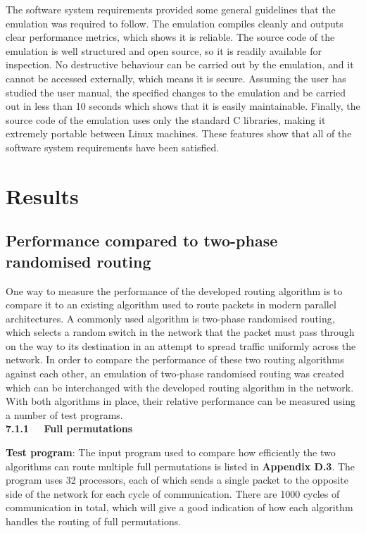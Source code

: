 \documentclass[a4paper, 12pt]{article}
\begin{document}
The software system requirements provided some general guidelines that the emulation was required to follow. The emulation compiles cleanly and outputs clear performance metrics, which shows it is reliable. The source code of the emulation is well structured and open source, so it is readily available for inspection. No destructive behaviour can be carried out by the emulation, and it cannot be accessed externally, which means it is secure. Assuming the user has studied the user manual, the specified changes to the emulation and be carried out in less than 10 seconds which shows that it is easily maintainable. Finally, the source code of the emulation uses only the standard C libraries, making it extremely portable between Linux machines. These features show that all of the software system requirements have been satisfied.

\newpage
\section{Results}

\subsection{Performance compared to two-phase randomised routing}

One way to measure the performance of the developed routing algorithm is to compare it to an existing algorithm used to route packets in modern parallel architectures. A commonly used algorithm is two-phase randomised routing, which selects a random switch in the network that the packet must pass through on the way to its destination in an attempt to spread traffic uniformly across the network. In order to compare the performance of these two routing algorithms against each other, an emulation of two-phase randomised routing was created which can be interchanged with the developed routing algorithm in the network. With both algorithms in place, their relative performance can be measured using a number of test programs.\\

\noindent\textbf{7.1.1 \ \ Full permutations}

\noindent\textbf{Test program}: The input program used to compare how efficiently the two algorithms can route multiple full permutations is listed in \textbf{Appendix D.3}. The program uses 32 processors, each of which sends a single packet to the opposite side of the network for each cycle of communication. There are 1000 cycles of communication in total, which will give a good indication of how each algorithm handles the routing of full permutations.  
\end{document}
